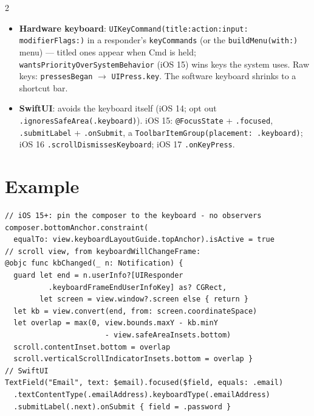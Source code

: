 \documentclass[8pt]{extarticle}
\begin{document}
\begin{multicols}{2}
\begin{itemize}
        \texttt{.editingDidEndOnExit}; \texttt{addAction(\_:for:)}). A programmatic
        \texttt{text =} triggers neither.
  \item \textbf{Hardware keyboard}: \texttt{UIKeyCommand(title:action:input:\allowbreak
        modifierFlags:)} in a responder's \texttt{keyCommands} (or the
        \texttt{buildMenu(with:)} menu) — titled ones appear when Cmd is held;
        \texttt{wantsPriorityOverSystemBehavior} (iOS 15) wins keys the system
        uses. Raw keys: \texttt{pressesBegan} $\to$ \texttt{UIPress.key}. The
        software keyboard shrinks to a shortcut bar.
  \item \textbf{SwiftUI}: avoids the keyboard itself (iOS 14; opt out
        \texttt{.ignoresSafeArea(.keyboard)}). iOS 15: \texttt{@FocusState} +
        \texttt{.focused}, \texttt{.submitLabel} + \texttt{.onSubmit}, a
        \texttt{ToolbarItemGroup(placement: .keyboard)}; iOS 16
        \texttt{.scrollDismissesKeyboard}; iOS 17 \texttt{.onKeyPress}.
\end{itemize}

\columnbreak

\section{Example}
\begin{lstlisting}[language=SwiftSheet]
// iOS 15+: pin the composer to the keyboard - no observers
composer.bottomAnchor.constraint(
  equalTo: view.keyboardLayoutGuide.topAnchor).isActive = true
// scroll view, from keyboardWillChangeFrame:
@objc func kbChanged(_ n: Notification) {
  guard let end = n.userInfo?[UIResponder
          .keyboardFrameEndUserInfoKey] as? CGRect,
        let screen = view.window?.screen else { return }
  let kb = view.convert(end, from: screen.coordinateSpace)
  let overlap = max(0, view.bounds.maxY - kb.minY
                       - view.safeAreaInsets.bottom)
  scroll.contentInset.bottom = overlap
  scroll.verticalScrollIndicatorInsets.bottom = overlap }
// SwiftUI
TextField("Email", text: $email).focused($field, equals: .email)
  .textContentType(.emailAddress).keyboardType(.emailAddress)
  .submitLabel(.next).onSubmit { field = .password }
\end{lstlisting}


\end{multicols}
\end{document}
